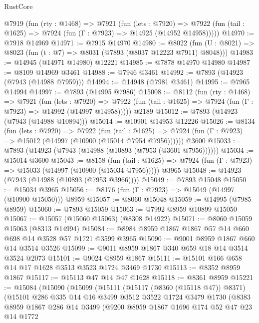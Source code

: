 \begin{lexlean}{RustCore}
\begin{coremodule}
  @7919
    (fun (rty : @1468) =>
    @7921
      (fun (lets : @7920) =>
      @7922 (fun (tail : @1625) => @7924 (fun (Γ : @7923) => @14925 (@14952 @14958)))))
@14970 := @7918 @14969
@14971 := @7915 @14970
@14980 := @8022
    (fun (U : @8021) => @8023 (fun (t : @7) => @8031 (@7893 (@8037 @12223 @7911) @8048)))
@14983 := @14945 (@14971 @14980) @12221
@14985 := @7878 @14970 @14980
@14987 := @8109 @14969 @3461
@14988 := @7946 @3461
@14992 := @7893 (@14923 (@7943 (@14988 @7959)))
@14994 := @14948 (@7981 @3461)
@14995 := @7965 @14994
@14997 := @7893 (@14995 @7986)
@15008 := @8112
    (fun (rty : @1468) =>
    @7921
      (fun (lets : @7920) =>
      @7922 (fun (tail : @1625) => @7924 (fun (Γ : @7923) => @14992 (@14997 @14958)))))
    @2189
@15012 := @7893 (@14923 (@7943 (@14988 @10894)))
@15014 := @10901 @14953 @12226
@15026 := @8134
    (fun (lets : @7920) =>
    @7922
      (fun (tail : @1625) =>
      @7924 (fun (Γ : @7923) => @15012 (@14997 (@10900 (@15014 @7954 @7956))))))
    @3600
@15033 := @7893 (@14923 (@7943 (@14988 (@10893 (@7953 (@3601 @7956))))))
@15034 := @15014 @3600
@15043 := @8158
    (fun (tail : @1625) => @7924 (fun (Γ : @7923) => @15033 (@14997 (@10900 (@15034 @7956)))))
    @3965
@15048 := @14923 (@7943 (@14988 (@10893 (@7953 @3966))))
@15049 := @7893 @15048
@15050 := @15034 @3965
@15056 := @8176 (fun (Γ : @7923) => @15049 (@14997 (@10900 @15050))) @8959
@15057 := @8060 @15048
@15059 := @14995 (@7985 @8959)
@15060 := @7893 @15059
@15063 := @7992 @8959 @10899 @15050
@15067 := @15057 (@15060 @15063) (@8308 @14922)
@15071 := @8060 @15059 @15063 (@8313 @14994)
@15084 := @8984 @8959 @1867 @1867 @57 @14 @660 @698 @14 @3528 @57 @1721 @3599 @3965
@15090 := @9001 @8959 @1867 @660 @14 @3514 @3526
@15099 := @9011 @8959 @1867 @340 @659 @18 @14 @3514 @3524 @2073
@15101 := @9024 @8959 @1867
@15111 := @15101 @166 @658 @14 @17 @1628 @3513 @3523 @1724 @3469 @1730
@15113 := @8352 @8959 @1867
@15117 := @15113 @47 @14 @47 @1628
@15118 := @8361 @8959
@15221 := @15084
    (@15090
      (@15099
        (@15111
          (@15117 (@8360 (@15118 @47)) @8371)
          (@15101
            @286
            @335
            @14
            @16
            @3499
            @3512
            @3522
            @1724
            @3479
            @1730
            (@8383
              @8959
              @1867
              @286
              @14
              @3499
              (@9200
                @8959
                @1867
                @1696
                @174
                @52
                @47
                @23
                @14
                @1772

\end{coremodule}
\end{lexlean}
